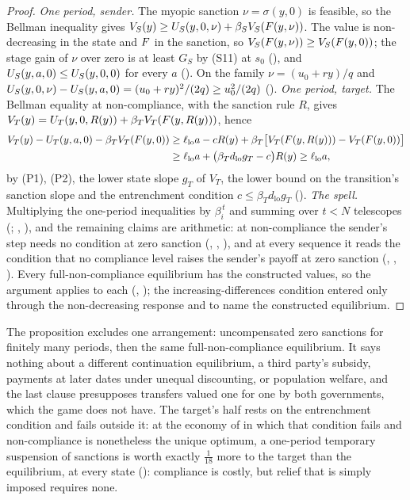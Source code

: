 \begin{proof}
\emph{One period, sender.} The myopic sanction $\nu=\sigma(y,0)$ is feasible, so
the Bellman inequality gives
$V_S(y)\ge U_S(y,0,\nu)+\beta_SV_S(F(y,\nu))$. The value is non-decreasing in
the state and $F$ in the sanction, so $V_S(F(y,\nu))\ge V_S(F(y,0))$; the
stage gain of $\nu$ over zero is at least $G_S$ by (S11) at $s_0$
(), and $U_S(y,a,0)\le U_S(y,0,0)$ for every $a$
(). On the family $\nu=(u_0+ry)/q$ and
$U_S(y,0,\nu)-U_S(y,a,0)=(u_0+ry)^2/(2q)\ge u_0^2/(2q)$
(). \emph{One period, target.} The
Bellman equality at non-compliance, with the sanction rule $R$, gives
$V_T(y)=U_T(y,0,R(y))+\beta_TV_T(F(y,R(y)))$, hence
\begin{align*}
V_T(y)-U_T(y,a,0)-\beta_TV_T(F(y,0))
&\ge\ell_{\mathrm{lo}}a-cR(y)+\beta_T\bigl[V_T(F(y,R(y)))-V_T(F(y,0))\bigr]\\
&\ge\ell_{\mathrm{lo}}a+\bigl(\beta_Td_{\mathrm{lo}}g_T-c\bigr)R(y)\ge\ell_{\mathrm{lo}}a,
\end{align*}
by (P1), (P2), the lower state slope $g_T$ of $V_T$, the lower bound on the transition's
sanction slope and the entrenchment condition $c\le\beta_Td_{\mathrm{lo}}g_T$
(). \emph{The spell.} Multiplying the one-period
inequalities by $\beta_i^{\,t}$ and summing over $t<N$ telescopes
(;
, ),
and the remaining claims are arithmetic: at non-compliance the sender's step needs
no condition at zero sanction (,
,
), and at every
sequence it reads the condition that no compliance level raises the sender's
payoff at zero sanction (,
,
). Every full-non-compliance equilibrium has the
constructed values, so the argument applies to each
(,
); the increasing-differences condition entered only
through the non-decreasing response and to name the constructed equilibrium.
\end{proof}

The proposition excludes one arrangement: uncompensated zero sanctions for
finitely many periods, then the same full-non-compliance equilibrium. It says nothing
about a different continuation equilibrium, a third party's subsidy, payments
at later dates under unequal discounting, or population welfare, and the last
clause presupposes transfers valued one for one by both governments, which the
game does not have. The target's half rests on the entrenchment condition and
fails outside it: at the economy of  in which that
condition fails and non-compliance is nonetheless the unique optimum, a one-period
temporary suspension of sanctions is worth exactly $\tfrac1{18}$ more to the target than
the equilibrium, at every state
(): compliance is costly, but
relief that is simply imposed requires none.

